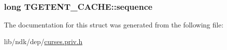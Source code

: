 \hypertarget{struct_t_g_e_t_e_n_t___c_a_c_h_e_a36c972fccdf3a3568f66b19ab6a78327}{
\subsubsection[{sequence}]{\setlength{\rightskip}{0pt plus 5cm}long T\-G\-E\-T\-E\-N\-T\-\_\-\-C\-A\-C\-H\-E\-::sequence}}\label{struct_t_g_e_t_e_n_t___c_a_c_h_e_a36c972fccdf3a3568f66b19ab6a78327}


The documentation for this struct was generated from the following file\-:\begin{DoxyCompactItemize}
\item 
lib/ndk/dep/\hyperlink{curses_8priv_8h}{curses.\-priv.\-h}\end{DoxyCompactItemize}
